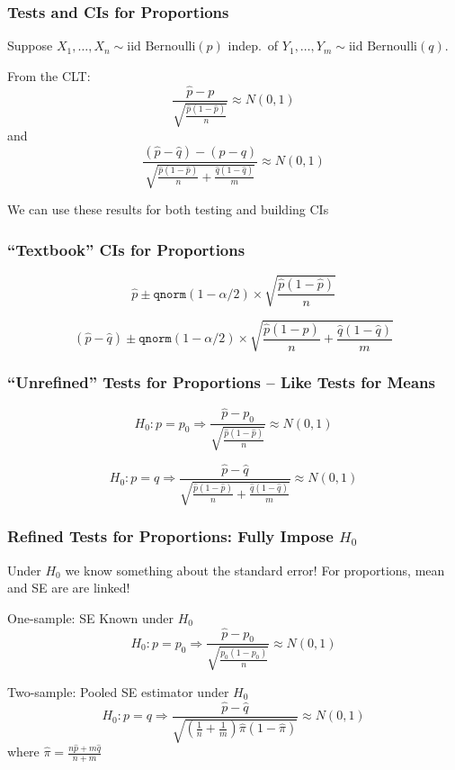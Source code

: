 \documentclass[handout]{beamer}
\begin{document}
\begin{frame}
\frametitle{Tests and CIs for Proportions}
\footnotesize
Suppose $X_1, \hdots, X_n \sim \mbox{iid Bernoulli}(p)$ indep.\ of $Y_1, \hdots, Y_m \sim \mbox{iid Bernoulli}(q)$.\\
\normalsize
\vspace{1em}

From the CLT:
	$$\frac{\hat{p} - p}{\sqrt{\frac{\hat{p}(1-\hat{p})}{n}}} \approx N(0,1)$$
and
$$\frac{(\hat{p} - \hat{q}) - (p-q)}{\sqrt{\frac{\hat{p}(1-\hat{p})}{n} + \frac{\hat{q}(1-\hat{q})}{m}}} \approx N(0,1)$$

\alert{We can use these results for both testing and building CIs}
\end{frame}
\begin{frame}
\frametitle{``Textbook'' CIs for Proportions}
	$$\widehat{p} \pm \texttt{qnorm}(1 - \alpha/2) \times \sqrt{\frac{\hat{p}(1-\hat{p})}{n}}$$
	
	$$\left(\widehat{p} -\widehat{q}\right)\pm \texttt{qnorm}(1 - \alpha/2) \times \sqrt{\frac{\hat{p}(1-\hat{p})}{n} + \frac{\hat{q}(1-\hat{q})}{m}}$$
\end{frame}
\begin{frame}
	\frametitle{``Unrefined'' Tests for Proportions -- Like Tests for Means}
	$$H_0\colon p = p_0 \Rightarrow \frac{\hat{p} - p_0}{\sqrt{\frac{\hat{p}(1-\hat{p})}{n}}} \approx N(0,1)$$
	\vspace{1em}
	
	$$H_0\colon p = q \Rightarrow \frac{\hat{p} - \hat{q}}{\sqrt{\frac{\hat{p}(1-\hat{p})}{n} + \frac{\hat{q}(1-\hat{q})}{m}}} \approx N(0,1)$$
\end{frame}
\begin{frame}
\frametitle{Refined Tests for Proportions: Fully Impose $H_0$}

\begin{block}{Under $H_0$ we know something about the standard error!}
For proportions, mean and SE are are linked!
\end{block}
\begin{block}{One-sample: SE Known under $H_0$}
	$$H_0\colon p = p_0 \Rightarrow \frac{\hat{p} - p_0}{\sqrt{\frac{p_0(1-p_0)}{n}}} \approx N(0,1)$$
\end{block}
	\pause
\begin{block}{Two-sample: Pooled SE estimator under $H_0$}
	$$H_0\colon p = q \Rightarrow \frac{\hat{p} - \hat{q}}{\sqrt{\left(\frac{1}{n} + \frac{1}{m} \right)\widehat{\pi}(1-\widehat{\pi})}} \approx N(0,1)$$
	where $\widehat{\pi} = \frac{n\widehat{p} + m\widehat{q}}{n+m}$
\end{block}
\end{frame}
\end{document}
